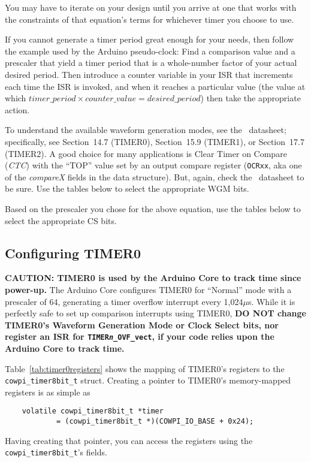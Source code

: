 You may have to iterate on your design until you arrive at one that works with the constraints of that equation's terms for whichever timer you choose to use.

If you cannot generate a timer period great enough for your needs, then follow the example used by the Arduino pseudo-clock:
Find a comparison value and a prescaler that yield a timer period that is a whole-number factor of your actual desired period.
Then introduce a counter variable in your ISR that increments each time the ISR is invoked, and when it reaches a particular value (the value at which $timer\_period \times counter\_value = desired\_period$) then take the appropriate action.

To understand the available waveform generation modes, see the \microcontroller\ datasheet;\cite{ATmega328P}
specifically, see Section~14.7 (TIMER0), Section~15.9 (TIMER1), or Section~17.7 (TIMER2).
A good choice for many applications is Clear Timer on Compare (\textit{CTC}) with the ``TOP'' value set by an output compare register (\texttt{OCRxx}, aka one of the \textit{compareX} fields in the data structure).
But, again, check the \microcontroller\ datasheet to be sure.
Use the tables below to select the appropriate WGM bits.

Based on the prescaler you chose for the above equation, use the tables below to select the appropriate CS bits.

\subsection{Configuring TIMER0}

\textbf{CAUTION: TIMER0 is used by the Arduino Core to track time since power-up.}
The Arduino Core configures TIMER0 for ``Normal'' mode with a prescaler of 64, generating a timer overflow interrupt every 1,024$\mu$s.
While it is perfectly safe to set up comparison interrupts using TIMER0, \textbf{DO NOT change TIMER0's Waveform Generation Mode or Clock Select bits, nor register an ISR for \texttt{TIMER\textit{n}\_OVF\_vect}, if your code relies upon the Arduino Core to track time.}

Table~\ref{tab:timer0registers} shows the mapping of TIMER0's registers to the \lstinline{cowpi_timer8bit_t} struct.
Creating a pointer to TIMER0's memory-mapped registers is as simple as
\begin{lstlisting}
    volatile cowpi_timer8bit_t *timer
            = (cowpi_timer8bit_t *)(COWPI_IO_BASE + 0x24);
\end{lstlisting}
Having creating that pointer, you can access the registers using the \lstinline{cowpi_timer8bit_t}'s fields.

